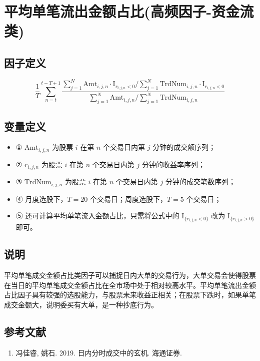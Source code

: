 \documentclass{article}
\begin{document}
\section{平均单笔流出金额占比(高频因子-资金流类)}

\subsection{因子定义}
\begin{equation}
    \frac{1}{T} \sum_{n=t}^{t-T+1} \frac{\sum_{j=1}^{N} \mathrm{Amt}_{i,j,n} \cdot \mathrm{I}_{r_{i,j,n} < 0} \Big/ \sum_{j=1}^{N} \mathrm{TrdNum}_{i,j,n} \cdot \mathrm{I}_{r_{i,j,n} < 0}}{\sum_{j=1}^{N} \mathrm{Amt}_{i,j,n} \Big/ \sum_{j=1}^{N} \mathrm{TrdNum}_{i,j,n}}
\end{equation}

\subsection{变量定义}
\begin{itemize}
    \item ① \( \mathrm{Amt}_{i,j,n} \) 为股票 \( i \) 在第 \( n \) 个交易日内第 \( j \) 分钟的成交额序列；
    \item ② \( r_{i,j,n} \) 为股票 \( i \) 在第 \( n \) 个交易日内第 \( j \) 分钟的收益率序列；
    \item ③ \( \mathrm{TrdNum}_{i,j,n} \) 为股票 \( i \) 在第 \( n \) 个交易日内第 \( j \) 分钟的成交笔数序列；
    \item ④ 月度选股下，\( T = 20 \) 个交易日；周度选股下，\( T = 5 \) 个交易日；
    \item ⑤ 还可计算平均单笔流入金额占比，只需将公式中的 \( \mathrm{I}_{\{r_{i,j,n} < 0\}} \) 改为 \( \mathrm{I}_{\{r_{i,j,n} > 0\}} \) 即可。
\end{itemize}

\subsection{说明}
平均单笔成交金额占比类因子可以捕捉日内大单的交易行为，大单交易会使得股票在当日的平均单笔成交金额占比在全市场中处于相对较高水平。平均单笔流出金额占比因子具有较强的选股能力，与股票未来收益正相关；在股票下跌时，如果单笔成交金额大，说明委买有大单，是一种抄底行为。

\subsection{参考文献}
\begin{enumerate}
    \item 冯佳睿, 姚石. 2019. 日内分时成交中的玄机. 海通证券.
\end{enumerate}
\end{document}
